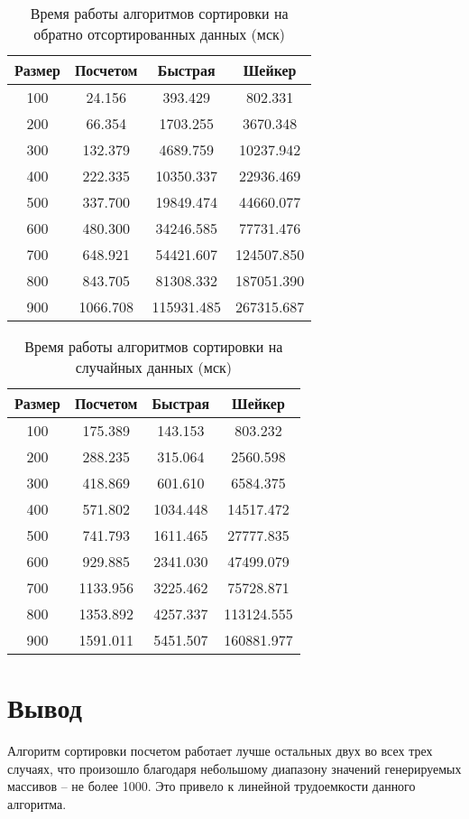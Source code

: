 \begin{table}[h]
	\begin{center}
		\caption{ Время работы алгоритмов сортировки на обратно	отсортированных данных (мск)}
		\label{tbl:wor}
		\begin{tabular}{|c|c|c|c|}
			\hline
			Размер & Посчетом &  Быстрая &  Шейкер \\
			\hline
			100 & 24.156 & 393.429 & 802.331 \\
			\hline
			200 & 66.354 & 1703.255 & 3670.348 \\
			\hline
			300 & 132.379 & 4689.759 & 10237.942 \\
			\hline
			400 & 222.335 & 10350.337 & 22936.469 \\
			\hline
			500 & 337.700 & 19849.474 & 44660.077 \\
			\hline
			600 & 480.300 & 34246.585 & 77731.476 \\
			\hline
			700 & 648.921 & 54421.607 & 124507.850 \\
			\hline
			800 & 843.705 & 81308.332 & 187051.390 \\
			\hline
			900 & 1066.708 & 115931.485 & 267315.687 \\
			\hline
		\end{tabular}
	\end{center}
	
\end{table}
\FloatBarrier


\FloatBarrier

\begin{table}[h]
	\begin{center}
		\caption{ Время работы алгоритмов сортировки на случайных данных (мск)}
		\label{tbl:random}
		\begin{tabular}{|c|c|c|c|}
			\hline
			Размер & Посчетом &  Быстрая &  Шейкер \\
			\hline
			100 & 175.389 & 143.153 & 803.232 \\
			\hline
			200 & 288.235 & 315.064 & 2560.598 \\
			\hline
			300 & 418.869 & 601.610 & 6584.375 \\
			\hline
			400 & 571.802 & 1034.448 & 14517.472 \\
			\hline
			500 & 741.793 & 1611.465 & 27777.835 \\
			\hline
			600 & 929.885 & 2341.030 & 47499.079 \\
			\hline
			700 & 1133.956 & 3225.462 & 75728.871 \\
			\hline
			800 & 1353.892 & 4257.337 & 113124.555 \\
			\hline
			900 & 1591.011 & 5451.507 & 160881.977 \\
			\hline
		\end{tabular}
	\end{center}

\end{table}
\FloatBarrier

\section*{Вывод}

Алгоритм сортировки посчетом работает лучше остальных двух во всех трех случаях, что произошло благодаря небольшому диапазону значений генерируемых массивов -- не более 1000. Это привело к линейной трудоемкости данного алгоритма.


